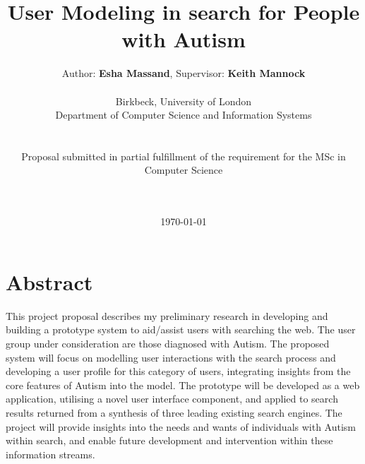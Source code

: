 \documentclass[a4paper, 11pt]{article}
\begin{document}
\LARGE\title{User Modeling in search for People with Autism}

\LARGE\author{Author: \textbf{Esha Massand}, Supervisor: \textbf{Keith Mannock}\\
\\
Birkbeck, University of London\\Department of Computer Science and Information Systems\\\\\\Proposal submitted in partial fulfillment of the requirement for the MSc in Computer Science\date{\mydate\today}
\\\
}

\normalsize


\maketitle


\section*{Abstract}
\begin{justify}
This project proposal describes my preliminary research in developing and building a prototype system to aid/assist users with searching the web. The user group under consideration are those diagnosed with Autism. The proposed system will focus on modelling user interactions with the search process and developing a user profile for this category of users, integrating insights from the core features of Autism into the model. The prototype will be developed as a web application, utilising a novel user interface component, and applied to search results returned from a synthesis of three leading existing search engines. The project will provide insights into the needs and wants of individuals with Autism within search, and enable future development and intervention within these information streams.\\
\end{justify}
\end{document}
